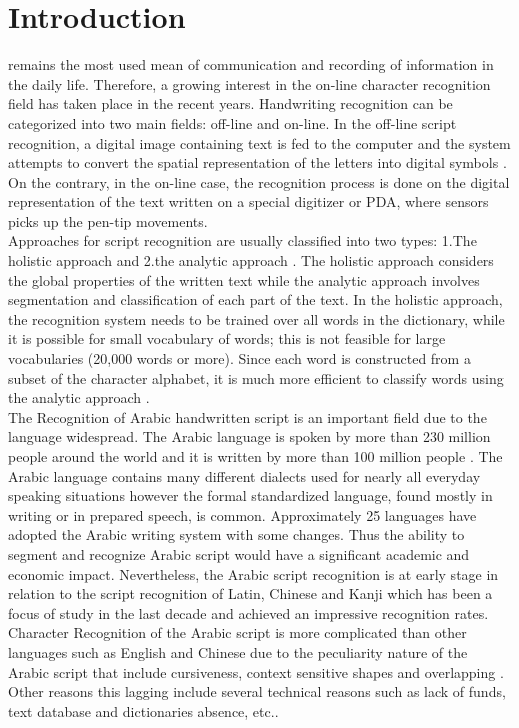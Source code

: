\documentclass[journal,compsoc]{IEEEtran}
\begin{document}
\IEEEdisplaynotcompsoctitleabstractindextext

\section{Introduction}
\date
{} remains the most used mean of communication and recording of information in the daily life. Therefore, a growing interest in the on-line character recognition field has taken place in the recent years. Handwriting recognition can be categorized into two main fields: off-line and on-line. In the off-line script recognition, a digital image containing text is fed to the computer and the system attempts to convert the spatial representation of the letters into digital symbols \cite{al2011online}. On the contrary, in the on-line case, the recognition process is done on the digital representation of the text written on a special digitizer or PDA, where sensors picks up the pen-tip movements.\\
 
Approaches for script recognition are usually classified into two types: 1.The holistic approach \cite{biadsy2011segmentation} and 2.the analytic approach \cite{abdulla2008off, sari2002off, Dinges2011, elanwar2012unconstrained}. The holistic approach considers the global properties of the written text while the analytic approach involves segmentation and classification of each part of the text.  In the holistic approach, the recognition system needs to be trained over all words in the dictionary, while it is possible for small vocabulary of words; this is not feasible for large vocabularies (20,000 words or more). Since each word is constructed from a subset of the character alphabet, it is much more efficient to classify words using the analytic approach \cite{elanwar2012unconstrained}.\\

The Recognition of Arabic handwritten script is an important field due to the language widespread. The Arabic language is spoken by more than 230 million people around the world and it is written by more than 100 million people \cite{al2011online}. The Arabic language contains many different dialects used for nearly all everyday speaking situations however the formal standardized language, found mostly in writing or in prepared speech, is common. Approximately 25 languages have adopted the Arabic writing system with some changes. Thus the ability to segment and recognize Arabic script would have a significant academic and economic impact. Nevertheless, the Arabic script recognition is at early stage in relation to the script recognition of Latin, Chinese and Kanji which has been a focus of study in the last decade and achieved an impressive recognition rates. 
Character Recognition of the Arabic script is more complicated than other languages such as English and Chinese due to the peculiarity nature of the Arabic script that include cursiveness, context sensitive shapes and overlapping \cite{razzak2010locally}. Other reasons this lagging include several technical reasons such as lack of funds, text database and dictionaries absence, etc.\cite{zeki2011segmentation}.\\
\end{document}
